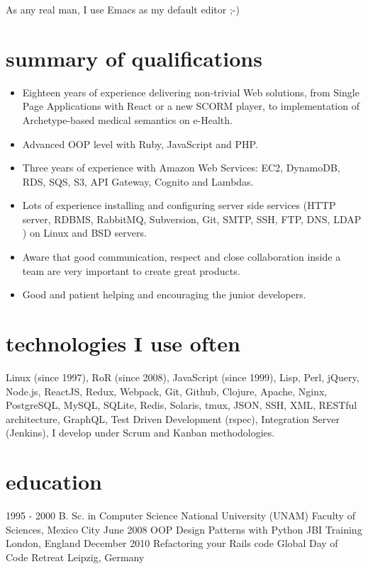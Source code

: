 \documentclass[]{k-cv}
\begin{document}
As any real man, I use Emacs as my default editor ;-)

\section{summary of qualifications}
  \begin{itemize}
    \item Eighteen years of experience delivering non-trivial Web solutions, from Single Page Applications
          with React or a new SCORM player, to implementation of Archetype-based medical semantics on e-Health.
    \item Advanced OOP level with Ruby, JavaScript and PHP.
    \item Three years of experience with Amazon Web Services: EC2, DynamoDB, RDS, SQS, S3, API Gateway, Cognito and Lambdas.
    \item Lots of experience installing and configuring server side services (HTTP server,
          RDBMS, RabbitMQ, Subversion, Git, SMTP, SSH, FTP, DNS, LDAP ) on Linux and
          BSD servers.
    \item Aware that good communication, respect and close collaboration inside a team
          are very important to create great products.
    \item Good and patient helping and encouraging the junior developers.
   \end{itemize}

\section{technologies I use often}

    Linux (since 1997), RoR (since 2008), JavaScript (since 1999), Lisp, Perl, jQuery, Node.js, ReactJS, Redux, Webpack, Git,
    Github, Clojure, Apache, Nginx, PostgreSQL, MySQL, SQLite, Redis, Solaris,
    tmux, JSON, SSH, XML, RESTful architecture, GraphQL, Test Driven Development (rspec),
    Integration Server (Jenkins), I develop under Scrum and Kanban methodologies.

\section{education}

\begin{entrylist}
  \entry
    {1995 - 2000}
    {B. Sc. in Computer Science}
    {National University (UNAM)}
	  {Faculty of Sciences, Mexico City}
  \entry
    {June 2008}
    {OOP Design Patterns with Python}
    {JBI Training}
    {London, England}
   \entry
    {December 2010}
    {Refactoring your Rails code}
    {Global Day of Code Retreat}
    {Leipzig, Germany}

\end{entrylist}
\end{document}
